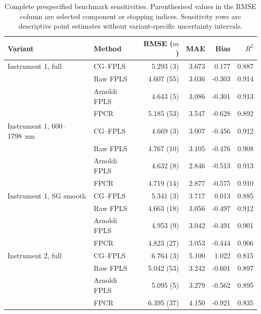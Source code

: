 \begin{table}[htbp]
    \centering
    \scriptsize
    \caption[Complete prespecified benchmark sensitivities]{Complete prespecified benchmark sensitivities.  Parenthesised
    values in the RMSE column are selected component or stopping indices.
    Sensitivity rows are descriptive point estimates without variant-specific
    uncertainty intervals.}
    \label{tab:app-spectroscopy-sensitivities}
    \begin{tabular}{@{}llrrrr@{}}
        \toprule
        Variant & Method & RMSE ($m$) & MAE & Bias & $R^2$ \\
        \midrule
        Instrument 1, full
          & CG--FPLS     & 5.293 (3)  & 3.673 &  0.177 & 0.887 \\
          & Raw FPLS     & 4.607 (55) & 3.036 & -0.303 & 0.914 \\
          & Arnoldi FPLS & 4.643 (5)  & 3.086 & -0.301 & 0.913 \\
          & FPCR         & 5.185 (53) & 3.547 & -0.628 & 0.892 \\
        \addlinespace
        Instrument 1, 600--1798~nm
          & CG--FPLS     & 4.669 (3)  & 3.007 & -0.456 & 0.912 \\
          & Raw FPLS     & 4.767 (10) & 3.105 & -0.476 & 0.908 \\
          & Arnoldi FPLS & 4.632 (8)  & 2.846 & -0.513 & 0.913 \\
          & FPCR         & 4.719 (14) & 2.877 & -0.575 & 0.910 \\
        \addlinespace
        Instrument 1, SG smooth
          & CG--FPLS     & 5.341 (3)  & 3.717 &  0.013 & 0.885 \\
          & Raw FPLS     & 4.663 (18) & 3.056 & -0.497 & 0.912 \\
          & Arnoldi FPLS & 4.953 (9)  & 3.042 & -0.491 & 0.901 \\
          & FPCR         & 4.823 (27) & 3.053 & -0.444 & 0.906 \\
        \addlinespace
        Instrument 2, full
          & CG--FPLS     & 6.764 (3)  & 5.100 &  1.022 & 0.815 \\
          & Raw FPLS     & 5.042 (53) & 3.242 & -0.601 & 0.897 \\
          & Arnoldi FPLS & 5.095 (5)  & 3.279 & -0.562 & 0.895 \\
          & FPCR         & 6.395 (37) & 4.150 & -0.921 & 0.835 \\
        \bottomrule
    \end{tabular}
\end{table}

